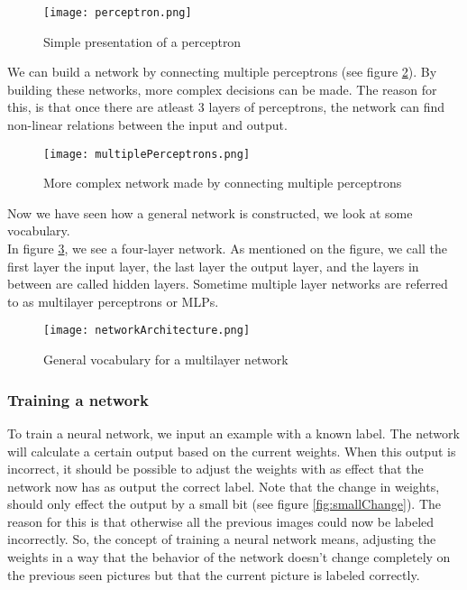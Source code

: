 \begin{figure}[H]
	\centering
	\texttt{[image: perceptron.png]}
	\caption{Simple presentation of a perceptron \cite{NNintro:online}}
	\label{fig:perceptron}
\end{figure}

We can build a network by connecting multiple perceptrons (see figure \ref{fig:multiplePerceptrons}). By building these networks, more complex decisions can be made. The reason for this, is that once there are atleast $3$ layers of perceptrons, the network can find non-linear relations between the input and output.

\begin{figure}[H]
	\centering
	\texttt{[image: multiplePerceptrons.png]}
	\caption{More complex network made by connecting multiple perceptrons \cite{NNintro:online}}
	\label{fig:multiplePerceptrons}
\end{figure}

Now we have seen how a general network is constructed, we look at some vocabulary. \\
In figure \ref{fig:networkArch}, we see a four-layer network. As mentioned on the figure, we call the first layer the input layer, the last layer the output layer, and the layers in between are called hidden layers. Sometime multiple layer networks are referred to as multilayer perceptrons or MLPs.

\begin{figure}[H]
	\centering
	\texttt{[image: networkArchitecture.png]}
	\caption{General vocabulary for a multilayer network \cite{NNintro:online}}
	\label{fig:networkArch}
\end{figure} 		


		\subsubsection{Training a network}
		
To train a neural network, we input an example with a known label. The network will calculate a certain output based on the current weights. When this output is incorrect, it should be possible to adjust the weights with as effect that the network now has as output the correct label. Note that the change in weights, should only effect the output by a small bit (see figure \ref{fig:smallChange}). The reason for this is that otherwise all the previous images could now be labeled incorrectly. So, the concept of training a neural network means, adjusting the weights in a way that the behavior of the network doesn't change completely on the previous seen pictures but that the current picture is labeled correctly.

